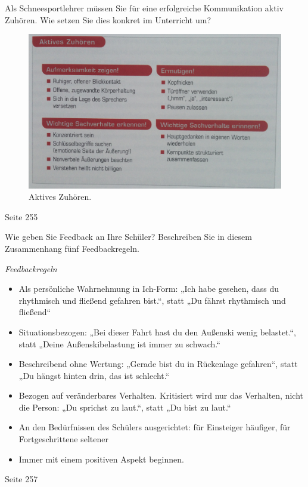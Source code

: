 \begin{question}{6}
Als Schneesportlehrer müssen Sie für eine erfolgreiche Kommunikation aktiv Zuhören. Wie setzen Sie dies konkret im Unterricht um?
\end{question}
\begin{solution}
\begin{figure}[H]
  \centering
  \includegraphics[width=12cm]{pic/zuhoeren.jpg}
  \caption{Aktives Zuhören.}
  \label{fig:zuhoeren}
\end{figure}
 Seite 255
\end{solution}

\begin{question}{6}
Wie geben Sie Feedback an Ihre Schüler? Beschreiben Sie in diesem Zusammenhang fünf Feedbackregeln.
\end{question}
\begin{solution}
\emph{Feedbackregeln}
\begin{itemize}
\item Als persönliche Wahrnehmung in Ich-Form: „Ich habe gesehen, dass du rhythmisch und fließend gefahren bist.“, statt „Du fährst rhythmisch und fließend“
\item Situationsbezogen: „Bei dieser Fahrt hast du den Außenski wenig belastet.“, statt „Deine Außenskibelastung ist immer zu schwach.“
\item Beschreibend ohne Wertung: „Gerade bist du in Rückenlage gefahren“, statt „Du hängst hinten drin, das ist schlecht.“
\item Bezogen auf veränderbares Verhalten. Kritisiert wird nur das Verhalten, nicht die Person: „Du sprichst zu laut.“, statt „Du bist zu laut.“
\item An den Bedürfnissen des Schülers ausgerichtet: für Einsteiger häufiger, für Fortgeschrittene seltener
\item Immer mit einem positiven Aspekt beginnen.
\end{itemize}
 Seite 257
\end{solution}

